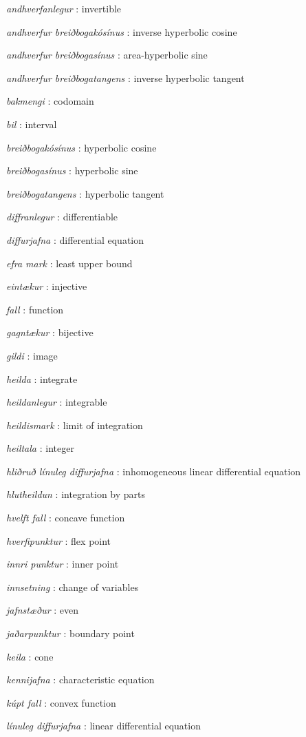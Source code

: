 \label{ordaskra:oraskra}\label{ordaskra::doc}
\emph{andhverfanlegur} : invertible

\emph{andhverfur breiðbogakósínus} : inverse hyperbolic cosine


\emph{andhverfur breiðbogasínus} : area-hyperbolic sine

\emph{andhverfur breiðbogatangens} : inverse hyperbolic tangent


\emph{bakmengi} : codomain

\emph{bil} : interval


\emph{breiðbogakósínus} : hyperbolic cosine


\emph{breiðbogasínus} : hyperbolic sine


\emph{breiðbogatangens} : hyperbolic tangent


\emph{diffranlegur} : differentiable


\emph{diffurjafna} : differential equation


\emph{efra mark} : least upper bound

\emph{eintækur} : injective

\emph{fall} : function


\emph{gagntækur} : bijective

\emph{gildi} : image

\emph{heilda} : integrate


\emph{heildanlegur} : integrable


\emph{heildismark} : limit of integration


\emph{heiltala} : integer

\emph{hliðruð línuleg diffurjafna} : inhomogeneous linear differential equation

\emph{hlutheildun} : integration by parts

\emph{hvelft fall} : concave function


\emph{hverfipunktur} : flex point

\emph{innri punktur} : inner point

\emph{innsetning} : change of variables

\emph{jafnstæður} : even


\emph{jaðarpunktur} : boundary point

\emph{keila} : cone


\emph{kennijafna} : characteristic equation


\emph{kúpt fall} : convex function


\emph{línuleg diffurjafna} : linear differential equation


